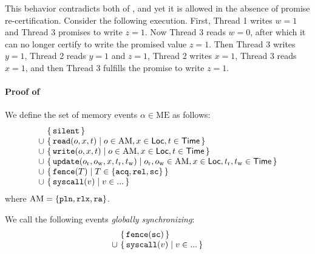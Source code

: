 \noindent This behavior contradicts both of , and yet it is allowed in the
absence of promise re-certification.  Consider the following execution.  First, Thread 1 writes $w=1$
and Thread 3 promises to write $z=1$.  Now Thread 3 reads $w=0$, after which it can no longer
certify to write the promised value $z=1$.  Then Thread 3 writes $y=1$, Thread 2 reads $y=1$ and
$z=1$, Thread 2 writes $x=1$, Thread 3 reads $x=1$, and then Thread 3 fulfills the promise to write
$z=1$.


\paragraph{Proof of }

\newcommand{\ME}{\textrm{ME}}
\newcommand{\AccMode}{\mathrm{AM}}
\newcommand{\mesilent}{\mathtt{silent}}
\newcommand{\meread}{\mathtt{read}}
\newcommand{\mewrite}{\mathtt{write}}
\newcommand{\meupdate}{\mathtt{update}}
\newcommand{\mefence}{\mathtt{fence}}
\newcommand{\mesyscall}{\mathtt{syscall}}
\newcommand{\mcths}{\mathtt{ths}}
\newcommand{\mcgsc}{\mathtt{gsc}}
\newcommand{\mcmem}{\mathtt{mem}}
\newcommand{\twomsg}[2]{\tup{#1\text{\small@}#2}}

\noindent
We define the set of memory events $\alpha\in\ME$ as follows:
\[
\begin{array}{@{}c@{~}l@{}}
 & \setof{\mesilent} \\
\cup& \setof{\meread(o,x,t) \suchthat o\in\AccMode ,x\in\Loc,t\in\Time } \\
\cup& \setof{\mewrite(o,x,t) \suchthat o\in\AccMode,x\in\Loc,t\in\Time} \\
\cup& \setof{\meupdate(o_\lr,o_\lw,x,t_\lr,t_\lw) \suchthat o_\lr,o_\lw\in\AccMode,x\in\Loc,t_\lr,t_\lw\in\Time } \\
\cup& \setof{\mefence(T) \suchthat T \in \setofz{\acqo,\relo,\sco} } \\
\cup& \setof{\mesyscall(v) \suchthat v \in ... } \\
\end{array}
\]
where $\AccMode = \setofz{\pln,\rlx,\ra}$. %

We call the following events \emph{globally synchronizing}:
\[
\begin{array}{@{}c@{~}l@{}}
& \setof{\mefence(\sco) } \\
\cup& \setof{\mesyscall(v) \suchthat v \in ... } \\
\end{array}
\]

